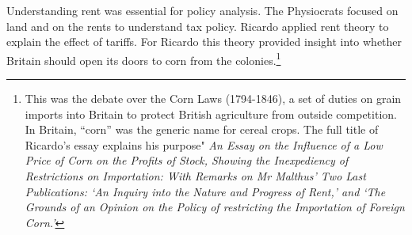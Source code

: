 Understanding rent was essential for policy analysis. The Physiocrats focused on land and on the rents to understand tax policy. Ricardo applied rent theory to explain the effect of tariffs. For Ricardo this theory provided insight into whether Britain should open its doors to corn from the colonies.\footnote{ This was the debate over the Corn Laws (1794-1846), a set of duties on grain imports into Britain to protect British agriculture from outside competition. In Britain, ``corn'' was the generic name for cereal crops. The full title of Ricardo's essay explains his purpose" \textit{An Essay on the Influence of a Low Price of Corn on the Profits of Stock, Showing the Inexpediency of Restrictions on Importation: With Remarks on Mr Malthus' Two Last Publications: `An Inquiry into the Nature and Progress of Rent,' and `The Grounds of an Opinion on the Policy of restricting the Importation of Foreign Corn.'} }




